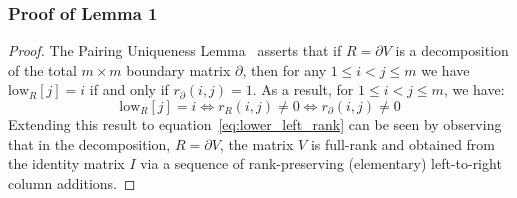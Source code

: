 \documentclass[10pt]{article}
\newcommand{\+}{%
	\raisebox{0.18ex}{\scaleobj{0.55}{+}}
}
\theoremstyle{definition}
\begin{document}
\subsubsection*{Proof of Lemma 1}
\begin{proof}
	The Pairing Uniqueness Lemma~\cite{dey2022computational} asserts that if $R = \partial V$ is a decomposition of the total $m \times m$ boundary matrix $\partial$, then for any $1 \leq i < j \leq m$ we have $\mathrm{low}_R[j] = i$ if and only if $r_\partial(i,j) = 1$. 
	As a result, for $1 \leq i < j \leq m$, we have:
\begin{equation}
	\mathrm{low}_R[j] = i \iff r_R(i,j) \neq 0 \iff r_\partial(i,j) \neq 0
\end{equation} 
Extending this result to equation~\eqref{eq:lower_left_rank} can be seen by observing that in the decomposition, $R = \partial V$, the matrix $V$ is full-rank and obtained from the identity matrix $I$ via a sequence of rank-preserving (elementary) left-to-right column additions.  
\end{proof}
\end{document}
